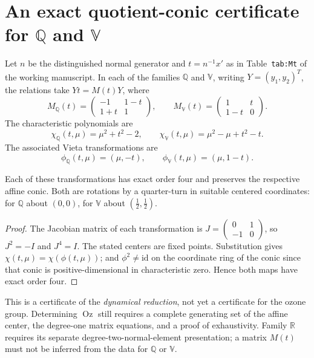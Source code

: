 \section{An exact quotient-conic certificate for $\mathbb Q$ and $\mathbb V$}
Let $n$ be the distinguished normal generator and $t=n^{-1}x'$ as in
Table~\texttt{tab:Mt} of the working manuscript. In each of the families
$\mathbb Q$ and $\mathbb V$, writing $Y=(y_1,y_2)^T$, the relations take
$Yt=M(t)Y$, where
\[
M_{\mathbb Q}(t)=\begin{pmatrix}-1&1-t\\1+t&1\end{pmatrix},\qquad
M_{\mathbb V}(t)=\begin{pmatrix}1&t\\1-t&0\end{pmatrix}.
\]
The characteristic polynomials are
\[
\chi_{\mathbb Q}(t,\mu)=\mu^2+t^2-2,\qquad
\chi_{\mathbb V}(t,\mu)=\mu^2-\mu+t^2-t.
\]
The associated Vieta transformations are
\[
\phi_{\mathbb Q}(t,\mu)=(\mu,-t),\qquad
\phi_{\mathbb V}(t,\mu)=(\mu,1-t).
\]
\begin{proposition}
Each of these transformations has exact order four and preserves the
respective affine conic. Both are rotations by a quarter-turn in
suitable centered coordinates: for $\mathbb Q$ about $(0,0)$, for
$\mathbb V$ about $(\frac12,\frac12)$.
\end{proposition}
\begin{proof}
The Jacobian matrix of each transformation is
$J=\left(\begin{smallmatrix}0&1\\-1&0\end{smallmatrix}\right)$,
so $J^2=-I$ and $J^4=I$. The stated centers are fixed points.
Substitution gives $\chi(t,\mu)=\chi(\phi(t,\mu))$; and
$\phi^2\ne\mathrm{id}$ on the coordinate ring of the conic since
that conic is positive-dimensional in characteristic zero. Hence both
maps have exact order four.
\end{proof}
This is a certificate of the \emph{dynamical reduction}, not yet a
certificate for the ozone group. Determining $\operatorname{Oz}$ still
requires a complete generating set of the affine center, the degree-one
matrix equations, and a proof of exhaustivity. Family $\mathbb R$
requires its separate degree-two-normal-element presentation; a
matrix $M(t)$ must not be inferred from the data for $\mathbb Q$ or
$\mathbb V$.
